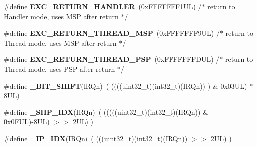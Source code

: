 \begin{DoxyCompactItemize}
\item 
\mbox{\label{group___c_m_s_i_s___core___n_v_i_c_functions_gaa6fa2b10f756385433e08522d9e4632f}} 
\#define {\bfseries E\+X\+C\+\_\+\+R\+E\+T\+U\+R\+N\+\_\+\+H\+A\+N\+D\+L\+ER}~(0x\+F\+F\+F\+F\+F\+F\+F1\+U\+L)     /$\ast$ return to Handler mode, uses M\+S\+P after return                               $\ast$/
\item 
\mbox{\label{group___c_m_s_i_s___core___n_v_i_c_functions_gaea4703101b5e679f695e231f7ee72331}} 
\#define {\bfseries E\+X\+C\+\_\+\+R\+E\+T\+U\+R\+N\+\_\+\+T\+H\+R\+E\+A\+D\+\_\+\+M\+SP}~(0x\+F\+F\+F\+F\+F\+F\+F9\+U\+L)     /$\ast$ return to Thread mode, uses M\+S\+P after return                                $\ast$/
\item 
\mbox{\label{group___c_m_s_i_s___core___n_v_i_c_functions_ga9998daf0fbdf31dbc8f81cd604b58175}} 
\#define {\bfseries E\+X\+C\+\_\+\+R\+E\+T\+U\+R\+N\+\_\+\+T\+H\+R\+E\+A\+D\+\_\+\+P\+SP}~(0x\+F\+F\+F\+F\+F\+F\+F\+D\+U\+L)     /$\ast$ return to Thread mode, uses P\+S\+P after return                                $\ast$/
\item 
\mbox{\label{group___c_m_s_i_s___core___n_v_i_c_functions_ga53c75b28823441c6153269f0ecbed878}} 
\#define {\bfseries \+\_\+\+B\+I\+T\+\_\+\+S\+H\+I\+FT}(I\+R\+Qn)~(  ((((uint32\+\_\+t)(int32\+\_\+t)(I\+R\+Qn))         )      \&  0x03\+U\+L) $\ast$ 8\+U\+L)
\item 
\mbox{\label{group___c_m_s_i_s___core___n_v_i_c_functions_gaee4f7eb5d7e770ad51489dbceabb1755}} 
\#define {\bfseries \+\_\+\+S\+H\+P\+\_\+\+I\+DX}(I\+R\+Qn)~( (((((uint32\+\_\+t)(int32\+\_\+t)(I\+R\+Qn)) \& 0x0\+F\+U\+L)-\/8\+U\+L) $>$$>$    2\+U\+L)      )
\item 
\mbox{\label{group___c_m_s_i_s___core___n_v_i_c_functions_ga370ec4b1751a6a889d849747df3763a9}} 
\#define {\bfseries \+\_\+\+I\+P\+\_\+\+I\+DX}(I\+R\+Qn)~(   (((uint32\+\_\+t)(int32\+\_\+t)(I\+R\+Qn))                $>$$>$    2\+U\+L)      )
\item 
\mbox{\label{group___c_m_s_i_s___core___n_v_i_c_functions_ga6834dd8c9c59394f1b544b57665293a4}} 

\end{DoxyCompactItemize}
